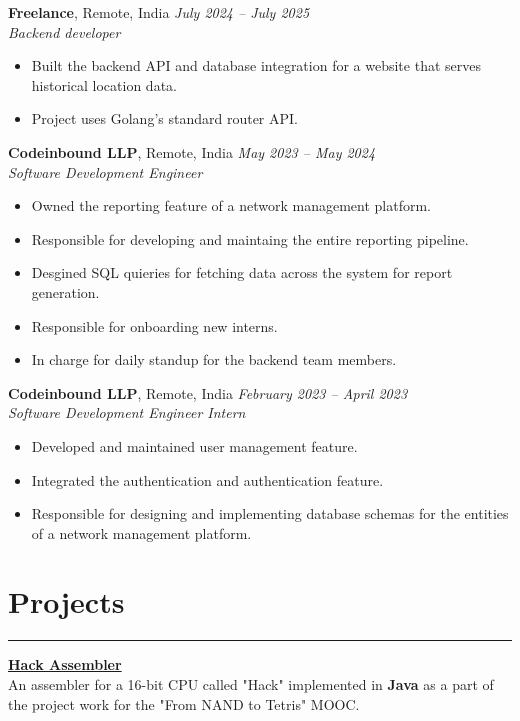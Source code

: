 \documentclass[11pt]{article}
\begin{document}
\textbf{Freelance}, Remote, India \hfill \textit{July 2024 -- July 2025} \\
\textit{Backend developer} \\
\vspace{-1.5\baselineskip}
\begin{itemize}[label=--]
	\item Built the backend API and database integration for a website that
	    serves historical location data.
	\item Project uses Golang's standard router API.
\end{itemize}

\textbf{Codeinbound LLP}, Remote, India \hfill \textit{May 2023 -- May 2024} \\
\textit{Software Development Engineer} \\
\vspace{-1.5\baselineskip}
\begin{itemize}[label=--]
	\item Owned the reporting feature of a network management platform.
	\item Responsible for developing and maintaing the entire reporting
		pipeline.
	\item Desgined SQL quieries for fetching data across the system for
		report generation.
	\item Responsible for onboarding new interns.
	\item In charge for daily standup for the backend team members.
\end{itemize}

\textbf{Codeinbound LLP}, Remote, India \hfill
\textit{February 2023 -- April 2023} \\
\textit{Software Development Engineer Intern} \\
\vspace{-1.5\baselineskip}
\begin{itemize}[label=--]
	\item Developed and maintained user management feature.
	\item Integrated the authentication and authentication feature.
	\item Responsible for designing and implementing database schemas for 
		the entities of a network management platform.
\end{itemize}

\vspace{-0.5\baselineskip}
\section*{Projects}
\hrule
\href{https://github.com/narayanan-gokul/hack-assembler}{\textbf{Hack Assembler}} \\
An assembler for a 16-bit CPU called "Hack" implemented in \textbf{Java} as a part of the
project work for the "From NAND to Tetris" MOOC.
\end{document}
